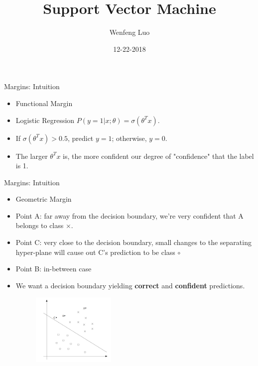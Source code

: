\documentclass{beamer}
\title[Support Vector Machine \hspace{0.5cm}\insertframenumber/\inserttotalframenumber]{Support Vector Machine}
\author{Wenfeng Luo}
\institute{Sun Yat-sen University}
\date{12-22-2018}
\begin{document}
\begin{frame}
  \titlepage
\end{frame}

\begin{frame}{Margins: Intuition}

\begin{itemize}
    \item Functional Margin
    \item Logistic Regression $P(y=1|x;\theta) = \sigma(\theta^Tx)$.
    \item If $\sigma(\theta^Tx) > 0.5$, predict $y=1$; otherwise, $y=0$.
    \item The larger $\theta^Tx$ is, the more confident our degree of "confidence" that the label is 1.
\end{itemize}

    
\end{frame}

\begin{frame}{Margins: Intuition}
\begin{itemize}
    \item Geometric Margin
    \item Point A: far away from the decision boundary, we're very confident that A belongs to class $\times$.
    \item Point C: very close to the decision boundary, small changes to the separating hyper-plane will cause out C's prediction to be class $\circ$
    \item Point B: in-between case
    \item We want a decision boundary yielding \textbf{correct} and \textbf{confident} predictions.
    \begin{figure}
    \includegraphics[width=4cm]{images/img1.png}
    \end{figure}
\end{itemize}    
\end{frame}

\end{document}
